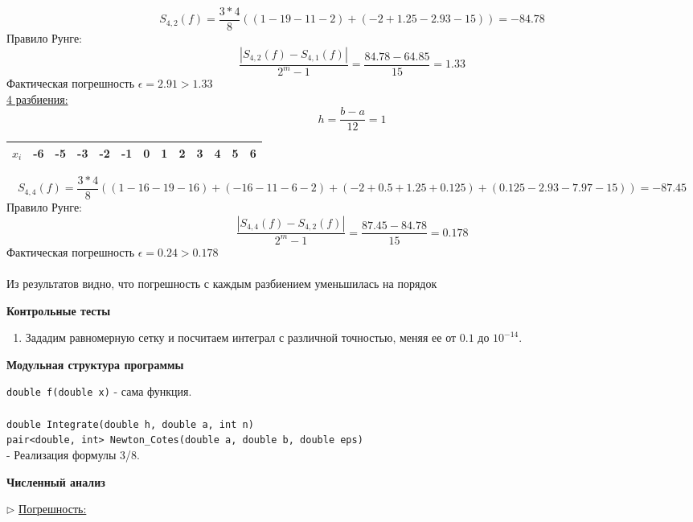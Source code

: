 \documentclass{article}
\begin{document}
	$$S_{4, 2}(f) = \frac{3*4}{8}((1 - 19 - 11 - 2) + (-2 + 1.25 - 2.93 - 15)) = -84.78$$
	Правило Рунге:
	$$\frac{|S_{4, 2}(f) - S_{4, 1}(f)|}{2^m - 1} = \frac{84.78-64.85}{15} = 1.33$$
	Фактическая погрешность $\epsilon = 2.91 > 1.33$\\
	\underline{4 разбиения:}\\
	$$h = \frac{b-a}{12} = 1$$
	\begin{center}
		\begin{tabular}{|c|c|c|c|c|c|c|c|c|c|c|c|c|}
			\hline
			$x_i$ & -6 & -5 & -3 & -2 & -1 & 0 & 1 & 2 & 3 & 4 & 5 & 6 \\
			\hline
		\end{tabular}
	\end{center}
	$$S_{4, 4}(f) = \frac{3*4}{8}((1 - 16 - 19 - 16) + (-16 - 11 - 6 - 2) + (-2 + 0.5 + 1.25 + 0.125) + (0.125 - 2.93 - 7.97 - 15)) = -87.45$$
	Правило Рунге:
	$$\frac{|S_{4, 4}(f) - S_{4, 2}(f)|}{2^m - 1} = \frac{87.45-84.78}{15} = 0.178$$
	Фактическая погрешность $\epsilon = 0.24 > 0.178$\\
	\\
	Из результатов видно, что погрешность с каждым разбиением уменьшилась на порядок
	\begin{center} \textbf{Контрольные тесты}\end{center}
	\begin{enumerate}
		\item Зададим равномерную сетку и посчитаем интеграл с различной точностью, меняя ее от $0.1$ до $10^{-14}$.
	\end{enumerate}
	\begin{center} \textbf{Модульная структура программы}\end{center}
	\verb|double f(double x)|
	- сама функция.\\
	\\
	\verb|double Integrate(double h, double a, int n)|\\
	\verb|pair<double, int> Newton_Cotes(double a, double b, double eps)|\\
	- Реализация формулы 3/8.
	\begin{center} \textbf{Численный анализ}\end{center}
	$\triangleright$ \underline{Погрешность:}\\
\end{document}
